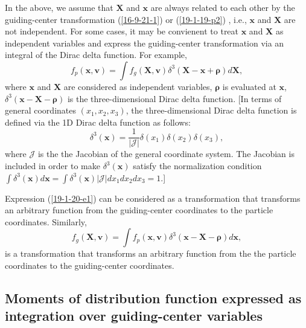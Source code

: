 \documentclass{llncs}
\newcommand{\tmmathbf}[1]{\ensuremath{\boldsymbol{#1}}}
\begin{document}
In the above, we assume that $\mathbf{X}$ and $\mathbf{x}$ are always related
to each other by the guiding-center transformation (\ref{16-9-21-1}) or
(\ref{19-1-19-p2}) , i.e., $\mathbf{x}$ and $\mathbf{X}$ are not independent.
For some cases, it may be convienent to treat $\mathbf{x}$ and $\mathbf{X}$ as
independent variables and express the guiding-center transformation via an
integral of the Dirac delta function. For example,
\begin{equation}
  \label{19-1-20-e1} f_p (\mathbf{x}, \mathbf{v}) = \int f_g (\mathbf{X},
  \mathbf{v}) \delta^3 (\mathbf{X}-\mathbf{x}+\tmmathbf{\rho}) d\mathbf{X},
\end{equation}
where $\mathbf{x}$ and $\mathbf{X}$ are considered as independent variables,
$\tmmathbf{\rho}$ is evaluated at $\mathbf{x}$, $\delta^3
(\mathbf{x}-\mathbf{X}-\tmmathbf{\rho})$ is the three-dimensional Dirac delta
function. [In terms of general coordinates $(x_1, x_2, x_3)$, the
three-dimensional Dirac delta function is defined via the 1D Dirac delta
function as follows:
\begin{equation}
  \delta^3 (\mathbf{x}) = \frac{1}{| \mathcal{J} |} \delta (x_1) \delta (x_2)
  \delta (x_3),
\end{equation}
where $\mathcal{J}$ is the the Jacobian of the general coordinate system. The
Jacobian is included in order to make $\delta^3 (\mathbf{x})$ satisfy the
normalization condition $\int \delta^3 (\mathbf{x}) d\mathbf{x}= \int \delta^3
(\mathbf{x}) | \mathcal{J} | d x_1 d x_2 d x_3 = 1$.]

Expression (\ref{19-1-20-e1}) can be considered as a transformation that
transforms an arbitrary function from the guiding-center coordinates to the
particle coordinates. Similarly,
\begin{equation}
  f_g (\mathbf{X}, \mathbf{v}) = \int f_p (\mathbf{x}, \mathbf{v}) \delta^3
  (\mathbf{x}-\mathbf{X}-\tmmathbf{\rho}) d\mathbf{x},
\end{equation}
is a transformation that transforms an arbitrary function from the the
particle coordinates to the guiding-center coordinates.

\subsection{Moments of distribution function expressed as integration over
guiding-center variables}
\end{document}

